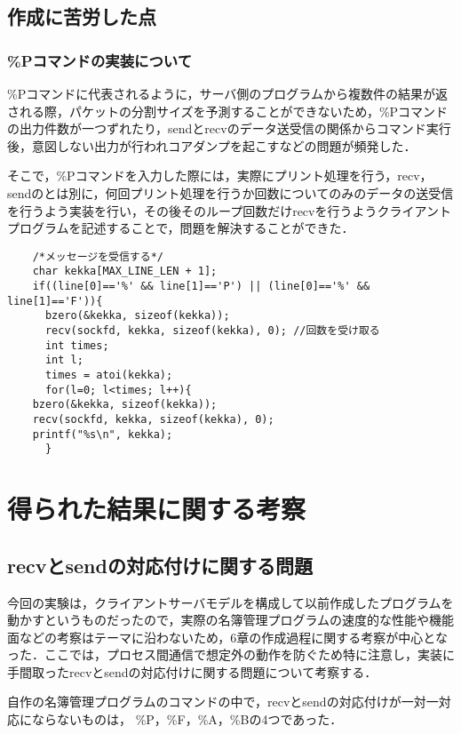 \documentclass[a4j]{jarticle}
\begin{document}
\subsection{作成に苦労した点}

\subsubsection{\%Pコマンドの実装について}
\%Pコマンドに代表されるように，サーバ側のプログラムから複数件の結果が返される際，パケットの分割サイズを予測することができないため，\%Pコマンドの出力件数が一つずれたり，sendとrecvのデータ送受信の関係からコマンド実行後，意図しない出力が行われコアダンプを起こすなどの問題が頻発した．

そこで，\%Pコマンドを入力した際には，実際にプリント処理を行う，recv，sendのとは別に，何回プリント処理を行うか回数についてのみのデータの送受信を行うよう実装を行い，その後そのループ回数だけrecvを行うようクライアントプログラムを記述することで，問題を解決することができた．

\begin{verbatim}
    /*メッセージを受信する*/
    char kekka[MAX_LINE_LEN + 1];
    if((line[0]=='%' && line[1]=='P') || (line[0]=='%' && line[1]=='F')){
      bzero(&kekka, sizeof(kekka));
      recv(sockfd, kekka, sizeof(kekka), 0); //回数を受け取る
      int times;
      int l;
      times = atoi(kekka);
      for(l=0; l<times; l++){
	bzero(&kekka, sizeof(kekka));
	recv(sockfd, kekka, sizeof(kekka), 0);
	printf("%s\n", kekka);
      }
\end{verbatim}

\section{得られた結果に関する考察}
\subsection{recvとsendの対応付けに関する問題}
今回の実験は，クライアントサーバモデルを構成して以前作成したプログラムを動かすというものだったので，実際の名簿管理プログラムの速度的な性能や機能面などの考察はテーマに沿わないため，6章の作成過程に関する考察が中心となった．ここでは，プロセス間通信で想定外の動作を防ぐため特に注意し，実装に手間取ったrecvとsendの対応付けに関する問題について考察する．

自作の名簿管理プログラムのコマンドの中で，recvとsendの対応付けが一対一対応にならないものは，
\%P，\%F，\%A，\%Bの4つであった．
\end{document}
